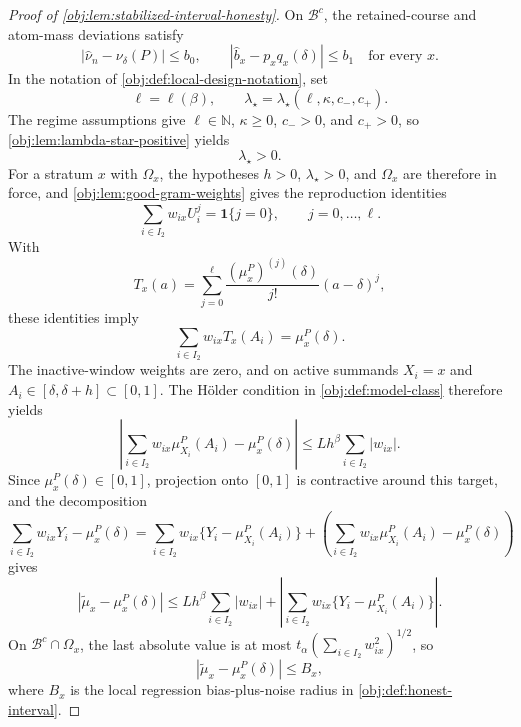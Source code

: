 \begin{proof}[Proof of \cref{obj:lem:stabilized-interval-honesty}]
On \(\mathcal B^c\), the retained-course and atom-mass deviations satisfy
\[
        |\widehat\nu_n-\nu_\delta(P)|\le b_0,
        \qquad
        |\widehat b_x-p_xq_x(\delta)|\le b_1
        \quad\text{for every }x .
\]
In the notation of \cref{obj:def:local-design-notation}, set
\[
        \ell=\ell(\beta),
        \qquad
        \lambda_\star=\lambda_\star(\ell,\kappa,c_-,c_+).
\]
The regime assumptions give \(\ell\in\mathbb N\), \(\kappa\ge0\), \(c_->0\), and \(c_+>0\), so \cref{obj:lem:lambda-star-positive} yields
\[
        \lambda_\star>0 .
\]
For a stratum \(x\) with \(\Omega_x\), the hypotheses \(h>0\), \(\lambda_\star>0\), and \(\Omega_x\) are therefore in force, and \cref{obj:lem:good-gram-weights} gives the reproduction identities
\[
        \sum_{i\in I_2}w_{ix}U_i^j=\mathbf 1\{j=0\},
        \qquad j=0,\ldots,\ell .
\]
With
\[
        T_x(a)=\sum_{j=0}^{\ell}
        \frac{(\mu_x^P)^{(j)}(\delta)}{j!}(a-\delta)^j,
\]
these identities imply
\[
        \sum_{i\in I_2}w_{ix}T_x(A_i)=\mu_x^P(\delta).
\]
The inactive-window weights are zero, and on active summands \(X_i=x\) and \(A_i\in[\delta,\delta+h]\subset[0,1]\).  The Hölder condition in \cref{obj:def:model-class} therefore yields
\[
\left|
\sum_{i\in I_2}w_{ix}\mu_{X_i}^P(A_i)-\mu_x^P(\delta)
\right|
\le
Lh^\beta\sum_{i\in I_2}|w_{ix}|.
\]
Since \(\mu_x^P(\delta)\in[0,1]\), projection onto \([0,1]\) is contractive around this target, and the decomposition
\[
\sum_{i\in I_2}w_{ix}Y_i-\mu_x^P(\delta)
=
\sum_{i\in I_2}w_{ix}\{Y_i-\mu_{X_i}^P(A_i)\}
+
\left(\sum_{i\in I_2}w_{ix}\mu_{X_i}^P(A_i)-\mu_x^P(\delta)\right)
\]
gives
\[
\left|
\widetilde\mu_x-\mu_x^P(\delta)
\right|
\le
Lh^\beta\sum_{i\in I_2}|w_{ix}|
+
\left|
\sum_{i\in I_2}w_{ix}\{Y_i-\mu^P_{X_i}(A_i)\}
\right|.
\]
On \(\mathcal B^c\cap\Omega_x\), the last absolute value is at most
\(t_\alpha(\sum_{i\in I_2}w_{ix}^2)^{1/2}\), so
\[
\left|
\widetilde\mu_x-\mu_x^P(\delta)
\right|
\le
B_x,
\]
where \(B_x\) is the local regression bias-plus-noise radius in \cref{obj:def:honest-interval}. %


\end{proof}
